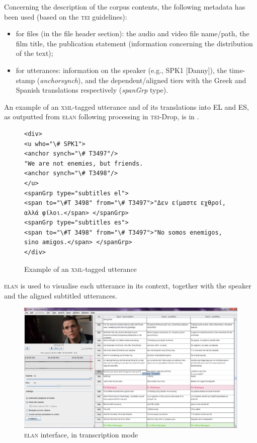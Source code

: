 \documentclass[output=paper]{LSP/langsci}
\begin{document}
Concerning the description of the corpus contents, the following metadata has been used (based on the \textsc{tei} guidelines):

\begin{itemize}
\item for files (in the file header section): the audio and video file name/path, the film title, the publication statement (information concerning the distribution of the text);
\item for utterances: information on the speaker (e.g., SPK1 [Danny]), the time-stamp (\textit{anchorsynch}), and the dependent/aligned tiers with the Greek and Spanish translations respectively (\textit{spanGrp} type).
\end{itemize}

An example of an \textsc{xml}-tagged utterance and of its translations into EL and ES, as outputted from \textsc{elan} following processing in \textsc{tei}-\textsc{D}rop, is in .

\begin{figure}
\caption{Example of an \textsc{xml}-tagged utterance} \label{fig:2:2}
\begin{lstlisting}
<div>
<u who="\# SPK1">
<anchor synch="\# T3497"/>
"We are not enemies, but friends.
<anchor synch="\# T3498"/>
</u>
<spanGrp type="subtitles el">
<span to="\#T 3498" from="\# T3497">"Δεν είμαστε εχθροί, αλλά φίλοι.</span> </spanGrp>
<spanGrp type="subtitles es">
<span to="\#T 3498" from="\# T3497">"No somos enemigos, sino amigos.</span> </spanGrp>
</div>
\end{lstlisting}
\end{figure}


\textsc{elan} is used to visualise each utterance in its context, together with the speaker and the aligned subtitled utterances.

\begin{figure}
\includegraphics[width=1.0\textwidth]{./figures/4-2.png}
\caption{\textsc{elan} interface, in transcription mode}
\end{figure}
\end{document}
